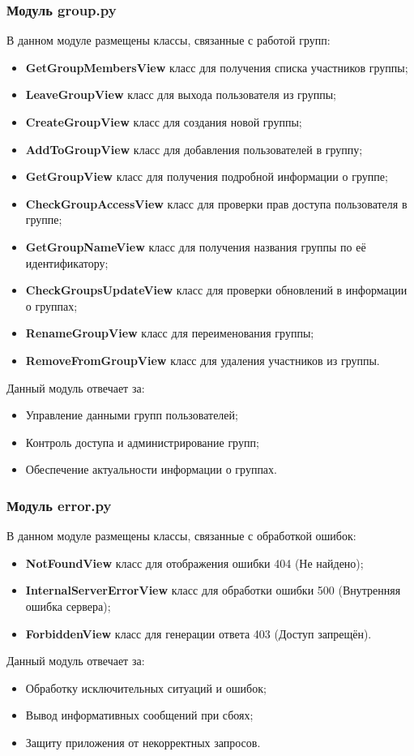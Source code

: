 \subsubsection{Модуль group.py}
В данном модуле размещены классы, связанные с работой групп:
\begin{itemize}
	\item \textbf{GetGroupMembersView} класс для получения списка участников группы;
	\item \textbf{LeaveGroupView} класс для выхода пользователя из группы;
	\item \textbf{CreateGroupView} класс для создания новой группы;
	\item \textbf{AddToGroupView} класс для добавления пользователей в группу;
	\item \textbf{GetGroupView} класс для получения подробной информации о группе;
	\item \textbf{CheckGroupAccessView} класс для проверки прав доступа пользователя в группе;
	\item \textbf{GetGroupNameView} класс для получения названия группы по её идентификатору;
	\item \textbf{CheckGroupsUpdateView} класс для проверки обновлений в информации о группах;
	\item \textbf{RenameGroupView} класс для переименования группы;
	\item \textbf{RemoveFromGroupView} класс для удаления участников из группы.
\end{itemize}
Данный модуль отвечает за:
\begin{itemize}
	\item Управление данными групп пользователей;
	\item Контроль доступа и администрирование групп;
	\item Обеспечение актуальности информации о группах.
\end{itemize}

\subsubsection{Модуль error.py}
В данном модуле размещены классы, связанные с обработкой ошибок:
\begin{itemize}
	\item \textbf{NotFoundView} класс для отображения ошибки 404 (Не найдено);
	\item \textbf{InternalServerErrorView} класс для обработки ошибки 500 (Внутренняя ошибка сервера);
	\item \textbf{ForbiddenView} класс для генерации ответа 403 (Доступ запрещён).
\end{itemize}
Данный модуль отвечает за:
\begin{itemize}
	\item Обработку исключительных ситуаций и ошибок;
	\item Вывод информативных сообщений при сбоях;
	\item Защиту приложения от некорректных запросов.
\end{itemize}

